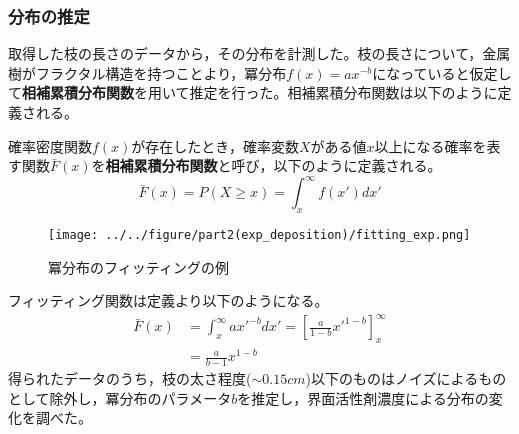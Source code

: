 \documentclass[autodetect-engine,dvi=dvipdfmx,a4paper,ja=standard,oneside,openany,11pt,draft]{bxjsarticle}
\begin{document}
\subsubsection{分布の推定}
取得した枝の長さのデータから，その分布を計測した。枝の長さについて，金属樹がフラクタル構造を持つことより，冪分布$f(x)=ax^{-b}$になっていると仮定して\textbf{相補累積分布関数}を用いて推定を行った。相補累積分布関数は以下のように定義される。
\begin{definition}
  確率密度関数$f(x)$が存在したとき，確率変数$X$がある値$x$以上になる確率を表す関数$\bar{F}(x)$を\textbf{相補累積分布関数}と呼び，以下のように定義される。
  \begin{equation}
    \bar{F}(x) = P(X \geq x) = \int_{x}^{\infty} f(x')dx'
  \end{equation}
\end{definition}
\begin{wrapfigure}{r}[0pt]{0.33\textwidth}
  \begin{center}
    \texttt{[image: ../../figure/part2(exp\_deposition)/fitting\_exp.png]}
  \end{center}
  \caption{冪分布のフィッティングの例}
  \label{fig:fitting_exp}
\end{wrapfigure}
フィッティング関数は定義より以下のようになる。
\begin{equation}
  \begin{split}
    \bar{F}(x) & = \int_{x}^{\infty} ax'^{-b}dx' = \left[ \frac{a}{1-b}x'^{1-b} \right]_{x}^{\infty} \\
               & = \frac{a}{b-1}x^{1-b}
  \end{split}
\end{equation}
得られたデータのうち，枝の太さ程度($\sim0.15\si{cm}$)以下のものはノイズによるものとして除外し，冪分布のパラメータ$b$を推定し，界面活性剤濃度による分布の変化を調べた。

\ifdraft{
  
  
}{}
\end{document}
